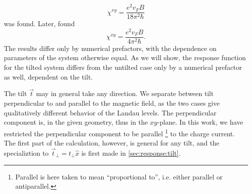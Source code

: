 \begin{equation}
  \chi ^{xy} = \frac{e^2 v_F B}{18 \pi ^2 \hbar }
\end{equation}
was found.
Later, \textcite{arjonaFingerprintsConformalAnomaly2019} found%
\begin{equation}
  \chi ^{xy} = \frac{e^2 v_F B}{4 \pi ^2 \hbar }.
\end{equation}
The results differ only by numerical prefactors, with the dependence on parameters of the system otherwise equal.
As we will show, the response function for the tilted system differs from the untilted case only by a numerical prefactor as well, dependent on the tilt.

The tilt \( \vec{t} \) may in general take any direction.
We separate between tilt perpendicular to and parallel to the magnetic field, as the two cases give qualitatively different behavior of the Landau levels.
The perpendicular component is, in the given geometry, thus in the \( xy \)-plane.
In this work, we have restricted the perpendicular component to be parallel%
\footnote{Parallel is here taken to mean ``proportional to'', i.e. either parallel or antiparallel.}
to the charge current.
The first part of the calculation, however, is general for any tilt, and the specializtion to \( \vec{t}_{\perp} = t_{\perp} \hat{x} \) is first made in \cref{sec:response:tilt}.

